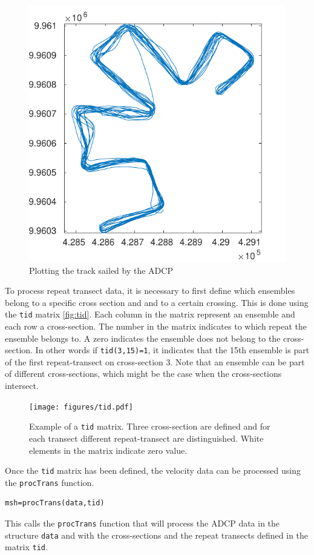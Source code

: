 \documentclass{book}
\newcommand{\ml}[1]{\lstinline{#1}}
\begin{document}
\begin{figure}[h]
  \centering
  \includegraphics{figures/track.pdf}
  \caption{Plotting the track sailed by the ADCP}
  \label{fig:track}
\end{figure}

To process repeat transect data, it is necessary to first define which ensembles belong to a specific cross section and and to a certain crossing. 
This is done using the \ml{tid} matrix \autoref{fig:tid}. Each column in the matrix represent an ensemble and each row a cross-section. The number in the matrix indicates to which repeat the ensemble belongs to. A zero indicates the ensemble does not belong to the cross-section. In other words if \ml{tid(3,15)=1}, it indicates that the 15th ensemble is part of the first repeat-transect on cross-section 3. Note that an ensemble can be part of different cross-sections, which might be the case when the cross-sections intersect.
\begin{figure}[h]
	\texttt{[image: figures/tid.pdf]}
	\caption{Example of a \ml{tid} matrix. Three cross-section are defined and for each transect different repeat-transect are distinguished. White elements in the matrix indicate zero value.}
	\label{fig:tid}
\end{figure}

Once the \ml{tid} matrix has been defined, the velocity data can be processed using the \ml{procTrans} function.
\begin{lstlisting}
msh=procTrans(data,tid)
\end{lstlisting}
This calls the \ml{procTrans} function that will process the ADCP data in the structure \ml{data} and with the cross-sections and the repeat transects defined in the matrix \ml{tid}. 
\end{document}
